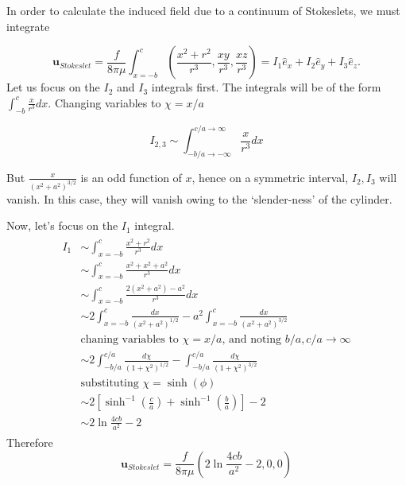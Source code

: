 \documentclass{article}
\begin{document}
In order to calculate the induced field due to a continuum of Stokeslets, we must integrate

\begin{equation}
 \boldsymbol{u}_{Stokeslet} = \frac{f}{8\pi \mu}\int_{x=-b}^{c}\left(\frac{x^{2} + r^{2}}{r^{3}}, \frac{xy}{r^{3}}, \frac{xz}{r^{3}} \right) = I_{1}\hat{e}_{x} + I_{2}\hat{e}_{y} + I_{3}\hat{e}_{z}.
\end{equation}
Let us focus on the $I_{2}$ and $I_{3}$ integrals first. The integrals will be of the form $\int_{-b}^{c}\frac{x}{r^{3}}dx$. Changing variables to $\chi = x/a$

\begin{equation}
 I_{2, 3} \sim \int_{-b/a \rightarrow -\infty}^{c/a \rightarrow \infty} \frac{x}{r^{3}} dx
\end{equation}

But $\frac{x}{(x^{2}+a^{2})^{3/2}}$ is an odd function of $x$, hence on a symmetric interval, $I_{2}, I_{3}$ will vanish. In this case, they will vanish owing to the `slender-ness' of the cylinder. 

Now, let's focus on the $I_{1}$ integral. 
\begin{align}
 \begin{split}
  I_{1} &\sim \int_{x=-b}^{c} \frac{x^{2} + r^{2}}{r^{3}} dx\\
  &\sim \int_{x=-b}^{c} \frac{x^{2} + x^{2} + a^{2}}{r^{3}} dx\\
  &\sim \int_{x=-b}^{c} \frac{2(x^{2} + a^{2}) - a^{2}}{r^{3}} dx\\
  &\sim 2\int_{x=-b}^{c} \frac{dx}{(x^{2} + a^{2})^{1/2}} - a^{2}\int_{x=-b}^{c} \frac{dx}{(x^{2} + a^{2})^{3/2}}\\
  &\textrm{chaning variables to } \chi = x/a  \textrm{, and noting } b/a, c/a \rightarrow \infty\\
  &\sim 2 \int_{-b/a}^{c/a} \frac{d\chi}{(1+\chi^{2})^{1/2}} - \int_{-b/a}^{c/a} \frac{d\chi}{(1+\chi^{2})^{3/2}}\\
  &\textrm{substituting }\chi = \sinh(\phi)\\
  &\sim 2\left[\sinh^{-1}\left(\frac{c}{a}\right) + \sinh^{-1}\left(\frac{b}{a}\right)\right] - 2\\
  &\sim 2 \ln{\frac{4cb}{a^{2}}} - 2
 \end{split}
\end{align}
Therefore
\begin{equation}\label{eq:u_stokeslet}
 \boldsymbol{u}_{Stokeslet} = \frac{f}{8\pi \mu} \left(2 \ln{\frac{4cb}{a^{2}}} - 2, 0, 0\right)
\end{equation}
\end{document}
